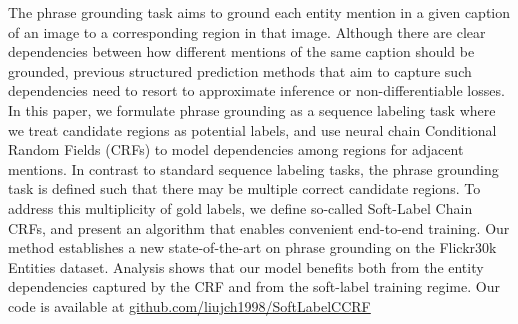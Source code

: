The phrase grounding task aims to ground each entity mention in a given caption of an image to a corresponding region in that image. Although there are clear dependencies between how different mentions of the same caption should be grounded, previous structured prediction methods that aim to capture such dependencies need to resort to approximate inference or non-differentiable losses. In this paper, we formulate phrase grounding as a sequence labeling task where we treat candidate regions as potential labels, and use neural chain Conditional Random Fields (CRFs) to model dependencies among regions for adjacent mentions. In contrast to standard sequence labeling tasks, the phrase grounding task is defined such that there may be multiple correct candidate regions. To address this multiplicity of gold labels, we define so-called Soft-Label Chain CRFs, and present an algorithm that enables convenient end-to-end training. Our method establishes a new state-of-the-art on phrase grounding on the Flickr30k Entities dataset. Analysis shows that our model benefits both from the entity dependencies captured by the CRF and from the soft-label training regime. Our code is available at \url{github.com/liujch1998/SoftLabelCCRF}